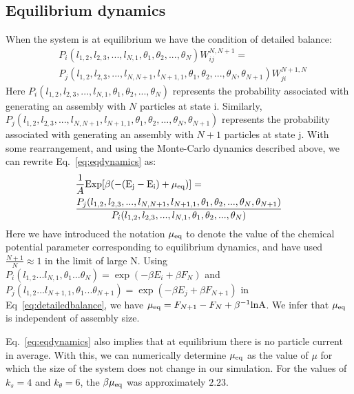 \documentclass[amsmath,preprintnumbers,10pt,nofootinbib,prl,twocolumn]{revtex4-1}
\begin{document}
\subsection{Equilibrium dynamics}
When the system is at equilibrium we have the condition of detailed balance:
\begin{equation}
\label{eq:eqdynamics}
\begin{split}
&P_i(l_{1,2},l_{2,3},...,l_{N,1},\theta_1,\theta_2,...,\theta_N)W^{N,N+1}_{ij}=\\
&P_j(l_{1,2},l_{2,3},...,l_{N,N+1},l_{N+1,1},\theta_1,\theta_2,...,\theta_N,\theta_{N+1})W^{N+1,N}_{ji}
\end{split}
\end{equation}
Here $P_i(l_{1,2},l_{2,3},...,l_{N,1},\theta_1,\theta_2,...,\theta_N)$ represents the probability associated with generating an assembly with $N$ particles at state i. Similarly, $P_j(l_{1,2},l_{2,3},...,l_{N,N+1},l_{N+1,1},\theta_1,\theta_2,...,\theta_N,\theta_{N+1})$ represents the probability associated with generating an assembly with $N+1$ particles at state j. With some rearrangement, and using the Monte-Carlo dynamics described above, we can rewrite Eq.~\ref{eq:eqdynamics} as:
\begin{equation}
\label{eq:detailedbalance}
\begin{split}
&\frac{1}{A}\rm{Exp[\beta(-(E_j - E_i)+\mu_{eq})]}=\\
&\frac{P_j(l_{1,2},l_{2,3},...,l_{N,N+1},l_{N+1,1},\theta_1,\theta_2,...,\theta_N,\theta_{N+1})}{P_i(l_{1,2},l_{2,3},...,l_{N,1},\theta_1,\theta_2,...,\theta_N)}
\end{split}
\end{equation}
Here we have introduced the notation $\mu_{\rm{eq}}$ to denote the value of the chemical potential parameter corresponding to equilibrium dynamics, and have used $\frac{N+1}{N}\approx 1$ in the limit of large N. Using $P_i(l_{1,2}...l_{N,1},\theta_1...\theta_N)=\exp (-\beta E_i +\beta F_N)$ and $P_j(l_{1,2}...l_{N+1,1},\theta_1...\theta_{N+1})=\exp (-\beta E_j +\beta F_{N+1})$ in Eq~\ref{eq:detailedbalance}, we have $\mu_{\rm{eq}}=F_{N+1}-F_{N}+\beta^{-1}\rm{ln} A$. We infer that $\mu_{\rm eq}$ is independent of assembly size.

Eq.~\ref{eq:eqdynamics} also implies that at equilibrium there is no particle current in average. With this, we can numerically determine $\mu_{\rm eq}$ as the value of $\mu$ for which the size of the system does not change in our simulation. For the values of $k_s=4$ and $k_\theta$$=6$, the $\beta\mu_{\rm eq}$ was approximately $2.23$.
\end{document}
